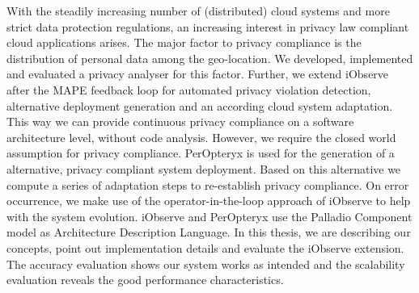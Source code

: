 
\Abstract

With the steadily increasing number of (distributed) cloud systems and more strict data protection regulations, an increasing interest in privacy law compliant cloud applications arises. The major factor to privacy compliance is the distribution of personal data among the geo-location. We developed, implemented and evaluated a privacy analyser for this factor. Further, we extend iObserve after the MAPE feedback loop for automated privacy violation detection, alternative deployment generation and an according cloud system adaptation. This way we can provide continuous privacy compliance on a software architecture level, without code analysis. However, we require the closed world assumption for privacy compliance. PerOpteryx is used for the generation of a alternative, privacy compliant system deployment. Based on this alternative we compute a series of adaptation steps to re-establish privacy compliance. On error occurrence, we make use of the operator-in-the-loop approach of iObserve to help with the system evolution. iObserve and PerOpteryx use the Palladio Component model as Architecture Description Language. In this thesis, we are describing our concepts, point out implementation details and evaluate the iObserve extension. The accuracy evaluation shows our system works as intended and the scalability evaluation reveals the good performance characteristics.
